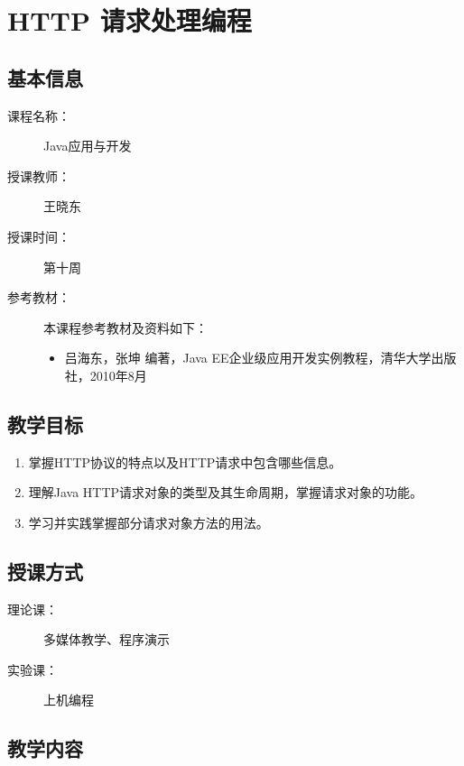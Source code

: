 \chapter*{HTTP 请求处理编程}
\label{chp:JavaEE-HTTP-request-handling}

\section*{基本信息}
\sline
\begin{description}
\item[课程名称：] Java应用与开发
\item[授课教师：] 王晓东
\item[授课时间：] 第十周
\item[参考教材：] 本课程参考教材及资料如下：
  \begin{itemize}
  \item 吕海东，张坤 编著，Java EE企业级应用开发实例教程，清华大学出版社，2010年8月
  \end{itemize}
\end{description}

\section*{教学目标}

\sline

\begin{enumerate}
\item 掌握HTTP协议的特点以及HTTP请求中包含哪些信息。
\item 理解Java HTTP请求对象的类型及其生命周期，掌握请求对象的功能。
\item 学习并实践掌握部分请求对象方法的用法。
\end{enumerate}  

\section*{授课方式}

\sline
\begin{description}
\item[理论课：] 多媒体教学、程序演示
\item[实验课：] 上机编程
\end{description}

\newpage
\section*{教学内容}
\sline

